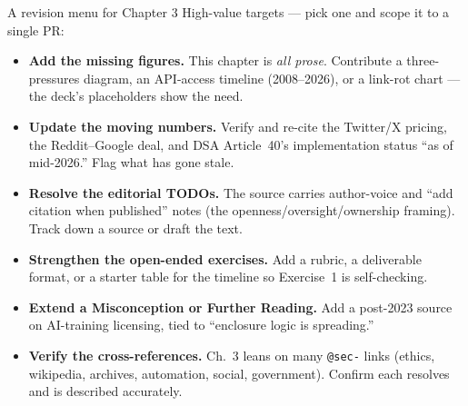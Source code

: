 \documentclass[9pt,aspectratio=169]{beamer}
\begin{document}
\begin{frame}{A revision menu for Chapter 3}
    High-value targets --- pick one and scope it to a single PR:
    \begin{itemize}\small
        \item \textbf{Add the missing figures.} This chapter is \textit{all prose}. Contribute a three-pressures diagram, an API-access timeline (2008--2026), or a link-rot chart --- the deck's placeholders show the need.
        \item \textbf{Update the moving numbers.} Verify and re-cite the Twitter/X pricing, the Reddit--Google deal, and DSA Article~40's implementation status ``as of mid-2026.'' Flag what has gone stale.
        \item \textbf{Resolve the editorial TODOs.} The source carries author-voice and ``add citation when published'' notes (the openness/oversight/ownership framing). Track down a source or draft the text.
        \item \textbf{Strengthen the open-ended exercises.} Add a rubric, a deliverable format, or a starter table for the timeline so Exercise~1 is self-checking.
        \item \textbf{Extend a Misconception or Further Reading.} Add a post-2023 source on AI-training licensing, tied to ``enclosure logic is spreading.''
        \item \textbf{Verify the cross-references.} Ch.~3 leans on many \texttt{@sec-} links (ethics, wikipedia, archives, automation, social, government). Confirm each resolves and is described accurately.
    \end{itemize}
\end{frame}
\end{document}
